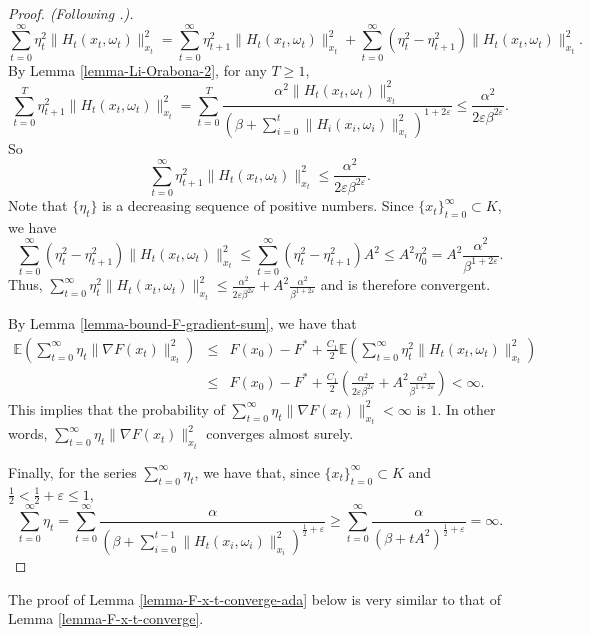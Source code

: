 \documentclass{amsart}
\newcommand{\E}{\mathbb{E}}
\newcommand{\ve}{\varepsilon}
\theoremstyle{plain}
\theoremstyle{definition}
\theoremstyle{remark}
\numberwithin{theorem}{section}
\numberwithin{equation}{section}
\begin{document}
\begin{proof}[Proof. (Following \cite{Li-Orabona}.)]
\[
\sum_{t=0}^\infty \eta_t^2\|H_t(x_t, \omega_t)\|_{x_t}^2 = \sum_{t=0}^\infty \eta_{t+1}^2\| H_t(x_t, \omega_t)\|_{x_t}^2 + \sum_{t=0}^\infty (\eta_t^2-\eta_{t+1}^2)\| H_t(x_t, \omega_t)\|_{x_t}^2.
\]
By Lemma \ref{lemma-Li-Orabona-2}, for any $T\geq 1$,
\[
\sum_{t=0}^T \eta_{t+1}^2\| H_t(x_t, \omega_t)\|_{x_t}^2 = \sum_{t=0}^T \frac{\alpha^2 \| H_t(x_t, \omega_t)\|_{x_t}^2}{(\beta+\sum_{i=0}^{t} \|H_i(x_i,\omega_i)\|_{x_i}^2)^{1+2\ve}} \leq \frac{\alpha^2}{2\ve \beta^{2\ve}}.
\]
So 
\[
\sum_{t=0}^\infty \eta_{t+1}^2\| H_t(x_t, \omega_t)\|_{x_t}^2 \leq \frac{\alpha^2}{2\ve \beta^{2\ve}}.
\]
Note that $\{\eta_t\}$ is a decreasing sequence of positive numbers. Since $\{x_{t}\}_{t=0}^\infty \subset K$, we have 
\[
\sum_{t=0}^\infty (\eta_t^2-\eta_{t+1}^2)\| H_t(x_t, \omega_t)\|_{x_t}^2 \leq \sum_{t=0}^\infty (\eta_t^2-\eta_{t+1}^2) A^2\leq A^2 \eta_0^2 = A^2 \frac{\alpha^2}{\beta^{1+2\ve}}.
\] 
Thus, $\sum_{t=0}^\infty \eta_{t}^2\| H_t(x_t, \omega_t)\|_{x_t}^2 \leq \frac{\alpha^2}{2\ve \beta^{2\ve}}+ A^2 \frac{\alpha^2}{\beta^{1+2\ve}}$ and is therefore convergent.

By Lemma \ref{lemma-bound-F-gradient-sum}, we have that 
\begin{eqnarray}
\label{eq-eta-nabla-F-x_t-sum-finite} \E(\sum_{t=0}^\infty \eta_t\| \nabla F(x_t)\|_{x_t}^2) & \leq &  F(x_0) - F^{\ast} + \frac{C_1}{2}\E(\sum_{t=0}^\infty \eta_t^2 \|H_t(x_t,\omega_t)\|_{x_t}^2) \\
\nonumber & \leq & F(x_0) - F^{\ast} + \frac{C_1}{2}(\frac{\alpha^2}{2\ve \beta^{2\ve}}+ A^2 \frac{\alpha^2}{\beta^{1+2\ve}})<\infty.
\end{eqnarray}
This implies that the probability of $\sum_{t=0}^\infty \eta_t\| \nabla F(x_t)\|_{x_t}^2<\infty$ is $1$. In other words, $\sum_{t=0}^\infty \eta_t\| \nabla F(x_t)\|_{x_t}^2$ converges almost surely.

Finally, for the series  $\sum_{t=0}^\infty \eta_t$, we have that, since $\{x_{t}\}_{t=0}^\infty \subset K$ and $\frac{1}{2}<\frac{1}{2}+\ve \leq 1$,
\[
\sum_{t=0}^\infty \eta_t = \sum_{t=0}^\infty\frac{\alpha}{(\beta+\sum_{i=0}^{t-1} \|H_t(x_i,\omega_i)\|_{x_i}^2)^{\frac{1}{2}+\ve}} \geq  \sum_{t=0}^\infty\frac{\alpha}{(\beta+t A^2)^{\frac{1}{2}+\ve}} =\infty.
\]
\end{proof}


The proof of Lemma \ref{lemma-F-x-t-converge-ada} below is very similar to that of Lemma \ref{lemma-F-x-t-converge}. 
\end{document}
